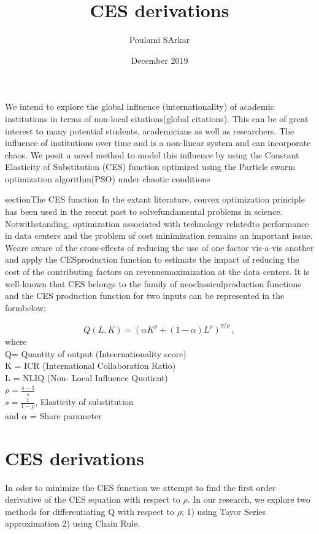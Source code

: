 \documentclass{article}
\title{CES derivations}
\author{Poulami SArkar}
\date{December 2019}
\begin{document}
\maketitle
We intend to explore the global influence (internationality) of academic institutions in terms of non-local citations(global citations).  This can be of great interest to many potential students, academicians as well as researchers.  The influence of institutions over time and is a non-linear system and can incorporate chaos.  We posit a novel method to model this influence by using the Constant Elasticity of Substitution (CES) function optimized using the Particle swarm optimization algorithm(PSO) under chaotic conditions

section{The CES function}
In the extant literature,  convex optimization principle has been used in the recent past to solvefundamental problems in science.  Notwithstanding, optimization associated with technology relatedto performance in data centers and the problem of cost minimization remains an important issue.  Weare aware of the cross-effects of reducing the use of one factor vis-a-vis another and apply the CESproduction function to estimate the impact of reducing the cost of the contributing factors on revenuemaximization  at  the  data  centers.   It  is  well-known  that  CES  belongs  to  the  family  of  neoclassicalproduction functions and the CES production function for two inputs can be represented in the formbelow:


\begin{equation}          
Q(L,K)=(\alpha{K}^\rho+(1-\alpha)L^\rho)^{\eta/\rho}\,,
\label{eq:CES}
\end{equation}
where\\
Q= Quantity of output (Inteernationality score)\\
K = ICR (International Collaboration Ratio)\\
L = NLIQ (Non- Local Influence Quotient)\\
\(\rho=\frac{s-1}{s}\) \\
\(s=\frac{1}{1-\rho}\), Elasticity of substitution\\
and \(\alpha\) = Share parameter

\section{CES derivations}
In oder to minimize the CES function we attempt to find the first order derivative of the CES equation with respect to $\rho$. In our research, we explore two methods for differentiating Q with respect to $\rho$; 1) using Tayor Series approximation 2) using Chain Rule.
\end{document}
